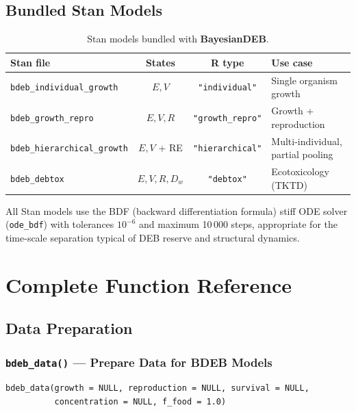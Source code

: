 \documentclass[11pt,a4paper]{article}
\newcommand{\pkg}[1]{\textbf{#1}}
\newcommand{\fn}[1]{\texttt{#1()}}
\newcommand{\code}[1]{\texttt{#1}}
\begin{document}
\subsection{Bundled Stan Models}

\begin{table}[htbp]
\centering
\caption{Stan models bundled with \pkg{BayesianDEB}.}
\label{tab:stan-models}
\begin{tabular}{lccl}
\toprule
\textbf{Stan file} & \textbf{States} & \textbf{R type} & \textbf{Use case} \\
\midrule
\code{bdeb\_individual\_growth} & $E, V$ & \code{"individual"} & Single organism growth \\
\code{bdeb\_growth\_repro} & $E, V, R$ & \code{"growth\_repro"} & Growth + reproduction \\
\code{bdeb\_hierarchical\_growth} & $E, V$ + RE & \code{"hierarchical"} & Multi-individual, partial pooling \\
\code{bdeb\_debtox} & $E, V, R, D_w$ & \code{"debtox"} & Ecotoxicology (TKTD) \\
\bottomrule
\end{tabular}
\end{table}

All Stan models use the BDF (backward differentiation formula) stiff ODE
solver (\code{ode\_bdf}) with tolerances $10^{-6}$ and maximum 10\,000
steps, appropriate for the time-scale separation typical of DEB reserve
and structural dynamics.

\section{Complete Function Reference}
\label{sec:functions}

\subsection{Data Preparation}

\subsubsection{\fn{bdeb\_data} --- Prepare Data for BDEB Models}

\begin{lstlisting}
bdeb_data(growth = NULL, reproduction = NULL, survival = NULL,
          concentration = NULL, f_food = 1.0)
\end{lstlisting}
\end{document}
